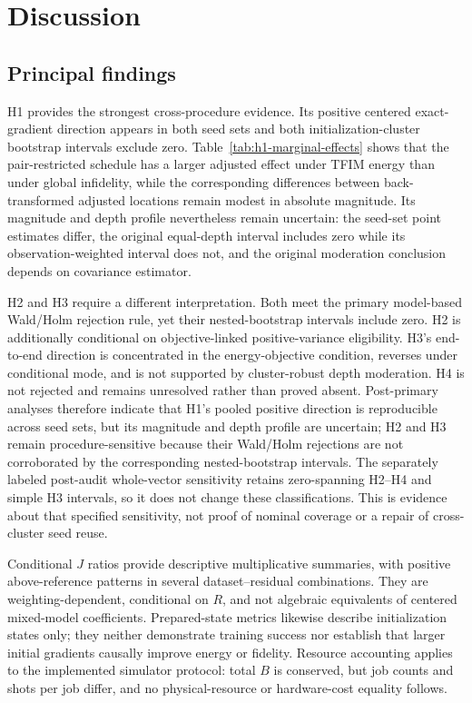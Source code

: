 \documentclass[pdflatex,sn-mathphys-num,Numbered]{sn-jnl}
\begin{document}
\section{Discussion}

\subsection{Principal findings}

H1 provides the strongest cross-procedure evidence. Its positive centered exact-gradient direction appears in both seed sets and both initialization-cluster bootstrap intervals exclude zero. Table~\ref{tab:h1-marginal-effects} shows that the pair-restricted schedule has a larger adjusted effect under TFIM energy than under global infidelity, while the corresponding differences between back-transformed adjusted locations remain modest in absolute magnitude. Its magnitude and depth profile nevertheless remain uncertain: the seed-set point estimates differ, the original equal-depth interval includes zero while its observation-weighted interval does not, and the original moderation conclusion depends on covariance estimator.

H2 and H3 require a different interpretation. Both meet the primary model-based Wald/Holm rejection rule, yet their nested-bootstrap intervals include zero. H2 is additionally conditional on objective-linked positive-variance eligibility. H3's end-to-end direction is concentrated in the energy-objective condition, reverses under conditional mode, and is not supported by cluster-robust depth moderation. H4 is not rejected and remains unresolved rather than proved absent. Post-primary analyses therefore indicate that H1's pooled positive direction is reproducible across seed sets, but its magnitude and depth profile are uncertain; H2 and H3 remain procedure-sensitive because their Wald/Holm rejections are not corroborated by the corresponding nested-bootstrap intervals. The separately labeled post-audit whole-vector sensitivity retains zero-spanning H2--H4 and simple H3 intervals, so it does not change these classifications. This is evidence about that specified sensitivity, not proof of nominal coverage or a repair of cross-cluster seed reuse.

Conditional $J$ ratios provide descriptive multiplicative summaries, with positive above-reference patterns in several dataset--residual combinations. They are weighting-dependent, conditional on $R$, and not algebraic equivalents of centered mixed-model coefficients. Prepared-state metrics likewise describe initialization states only; they neither demonstrate training success nor establish that larger initial gradients causally improve energy or fidelity. Resource accounting applies to the implemented simulator protocol: total $B$ is conserved, but job counts and shots per job differ, and no physical-resource or hardware-cost equality follows.
\end{document}
